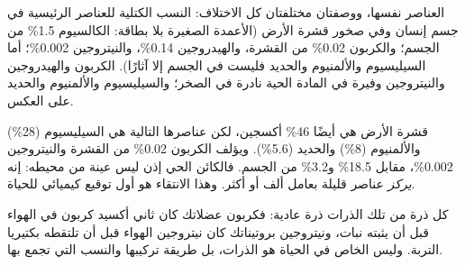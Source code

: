 \begin{omfigure}

{\small العناصر نفسها، ووصفتان مختلفتان كل الاختلاف: النسب الكتلية
للعناصر الرئيسية في جسم إنسان وفي صخور قشرة الأرض (الأعمدة الصغيرة بلا
بطاقة: الكالسيوم 1.5\% من الجسم؛ والكربون 0.02\% من القشرة،
والهيدروجين 0.14\%، والنيتروجين 0.002\%؛ أما السيليسيوم والألمنيوم
والحديد فليست في الجسم إلا آثارًا). الكربون والهيدروجين والنيتروجين
وفيرة في المادة الحية نادرة في الصخر؛ والسيليسيوم والألمنيوم والحديد
على العكس.}
\end{omfigure}

\begin{example}\label{ex:g10:chemistry-of-life:crust}
قشرة الأرض هي أيضًا 46\% أكسجين، لكن عناصرها التالية هي السيليسيوم
(28\%) والألمنيوم (8\%) والحديد (5.6\%). ويؤلف الكربون 0.02\% من
القشرة والنيتروجين 0.002\%، مقابل 18.5\% و3.2\% من الجسم. فالكائن
الحي إذن ليس عينة من محيطه: إنه \emph{يركز} عناصر قليلة بعامل ألف أو
أكثر. وهذا الانتقاء هو أول توقيع كيميائي للحياة.
\end{example}

\begin{remark}\label{rem:g10:chemistry-of-life:origin}
كل ذرة من تلك الذرات ذرة عادية: فكربون عضلاتك كان ثاني أكسيد كربون في
الهواء قبل أن يثبته نبات، ونيتروجين بروتيناتك كان نيتروجين الهواء قبل
أن تلتقطه بكتيريا التربة. وليس الخاص في الحياة هو الذرات، بل طريقة
تركيبها والنسب التي تجمع بها.
\end{remark}

